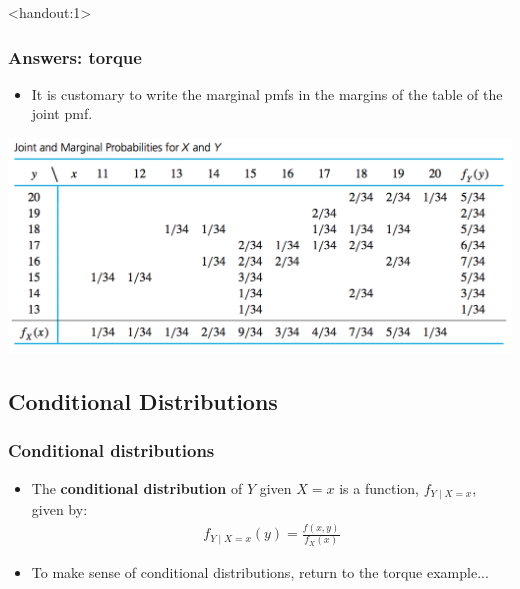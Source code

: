 \documentclass[handout]{beamer}\usepackage[]{graphicx}\usepackage[]{color}
\newcommand{\answers}{1}
\numberwithin{equation}{section}
\begin{document}
\begin{frame}<handout:\answers>
\frametitle{Answers: torque}
\begin{itemize}
\item It is customary to write the marginal pmfs in the margins of the table of the joint pmf.
\end{itemize}
 \includegraphics{../../fig/torquetablemar.png}
\end{frame}


\subsection{Conditional Distributions}

\begin{frame}
\frametitle{Conditional distributions}
\begin{itemize}
\pause \item The {\bf conditional distribution} of $Y$ given $X = x$ is a function, $f_{Y \mid X = x}$, given by:
\pause \begin{align*}
f_{Y \mid X = x}(y) = \frac{f(x,y)}{f_X(x)}
\end{align*}
\pause \item To make sense of conditional distributions, return to the torque example...
\end{itemize}
\end{frame}
\end{document}
